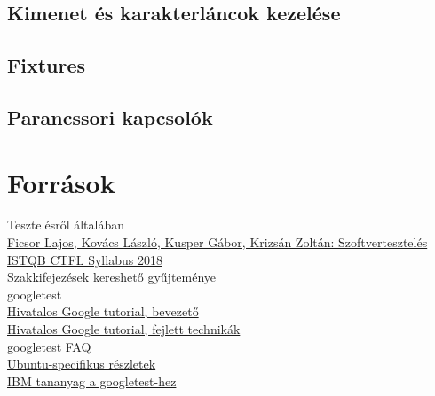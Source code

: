 \documentclass[usenames,dvipsnames,aspectratio=169]{beamer}
\newcommand{\hiv}[1]{{\color{hivatkozasszin}#1}}
\begin{document}


\subsection{Kimenet és karakterláncok kezelése}



\subsection{Fixtures}



\subsection{Parancssori kapcsolók}




\section{Források}

\begin{frame}
  Tesztelésről általában\\
  \hiv{\href{https://www.tankonyvtar.hu/hu/tartalom/tamop425/0046\_szoftverteszteles/index.html}%
  {Ficsor Lajos, Kovács László, Kusper Gábor, Krizsán Zoltán: Szoftvertesztelés}}\\
  \hiv{\href{https://hstqb.org/downloadarea/istqb-ctfl-syllabus-2018-magyar/}{ISTQB CTFL Syllabus 2018}}\\
  \hiv{\href{https://glossary.istqb.org/en/search/}{Szakkifejezések kereshető gyűjteménye}}\\
  \vfill
  googletest\\
  \hiv{\href{https://github.com/google/googletest/blob/master/googletest/docs/primer.md}%
    {Hivatalos Google tutorial, bevezető}}\\
  \hiv{\href{https://github.com/google/googletest/blob/master/googletest/docs/advanced.md}%
    {Hivatalos Google tutorial, fejlett technikák}}\\
  \hiv{\href{https://github.com/google/googletest/blob/master/googletest/docs/faq.md}{googletest FAQ}}\\
  \hiv{\href{https://www.eriksmistad.no/getting-started-with-google-test-on-ubuntu/}%
    {Ubuntu-specifikus részletek}}\\
  \hiv{\href{https://developer.ibm.com/articles/au-googletestingframework/}{IBM tananyag a googletest-hez}}\\
\end{frame}
\end{document}
